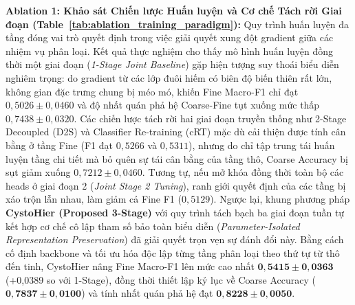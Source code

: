 \documentclass[runningheads]{llncs}
\begin{document}
\noindent \textbf{Ablation 1: Khảo sát Chiến lược Huấn luyện và Cơ chế Tách rời Giai đoạn (Table~\ref{tab:ablation_training_paradigm}):} 
Quy trình huấn luyện đa tầng đóng vai trò quyết định trong việc giải quyết xung đột gradient giữa các nhiệm vụ phân loại. Kết quả thực nghiệm cho thấy mô hình huấn luyện đồng thời một giai đoạn (\textit{1-Stage Joint Baseline}) gặp hiện tượng suy thoái biểu diễn nghiêm trọng: do gradient từ các lớp đuôi hiếm có biên độ biến thiên rất lớn, không gian đặc trưng chung bị méo mó, khiến Fine Macro-F1 chỉ đạt $0{,}5026 \pm 0{,}0460$ và độ nhất quán phả hệ Coarse-Fine tụt xuống mức thấp $0{,}7438 \pm 0{,}0320$. Các chiến lược tách rời hai giai đoạn truyền thống như 2-Stage Decoupled (D2S) và Classifier Re-training (cRT) \cite{ref_kang2020decoupling} mặc dù cải thiện được tính cân bằng ở tầng Fine (F1 đạt $0{,}5266$ và $0{,}5311$), nhưng do chỉ tập trung tái huấn luyện tầng chi tiết mà bỏ quên sự tái cân bằng của tầng thô, Coarse Accuracy bị sụt giảm xuống $0{,}7212 \pm 0{,}0460$. Tương tự, nếu mở khóa đồng thời toàn bộ các heads ở giai đoạn 2 (\textit{Joint Stage 2 Tuning}), ranh giới quyết định của các tầng bị xáo trộn lẫn nhau, làm giảm cả Fine F1 ($0{,}5129$). Ngược lại, khung phương pháp \textbf{CystoHier (Proposed 3-Stage)} với quy trình tách bạch ba giai đoạn tuần tự kết hợp cơ chế cô lập tham số bảo toàn biểu diễn (\textit{Parameter-Isolated Representation Preservation}) đã giải quyết trọn vẹn sự đánh đổi này. Bằng cách cố định backbone và tối ưu hóa độc lập từng tầng phân loại theo thứ tự từ thô đến tinh, CystoHier nâng Fine Macro-F1 lên mức cao nhất $\mathbf{0{,}5415 \pm 0{,}0363}$ (+0,0389 so với 1-Stage), đồng thời thiết lập kỷ lục về Coarse Accuracy ($\mathbf{0{,}7837 \pm 0{,}0100}$) và tính nhất quán phả hệ đạt $\mathbf{0{,}8228 \pm 0{,}0050}$.
\end{document}
